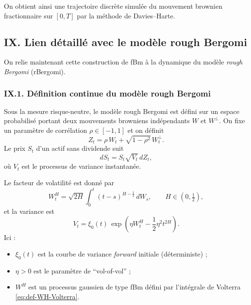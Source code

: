 \documentclass[11pt,a4paper]{article}
\newcommand{\1}{\mathbf{1}}
\begin{document}
On obtient ainsi une trajectoire discrète simulée du mouvement
brownien fractionnaire sur $[0,T]$ par la méthode de
Davies--Harte.

\subsection*{IX. Lien détaillé avec le modèle rough Bergomi}

On relie maintenant cette construction de fBm à la dynamique du
modèle \emph{rough Bergomi} (rBergomi).

\subsubsection*{IX.1. Définition continue du modèle rough Bergomi}

Sous la mesure risque-neutre, le modèle rough Bergomi est défini
sur un espace probabilisé portant deux mouvements browniens
indépendants $W$ et $W^\perp$. On fixe un paramètre de corrélation
$\rho\in[-1,1]$ et on définit
\begin{equation}
  Z_t = \rho\,W_t + \sqrt{1-\rho^2}\,W_t^\perp.
\end{equation}
Le prix $S_t$ d'un actif sans dividende suit
\begin{equation}
  dS_t = S_t \sqrt{V_t}\,dZ_t,
\end{equation}
où $V_t$ est le processus de variance instantanée.

Le facteur de volatilité est donné par
\begin{equation}
  \label{eq:def-WH-Volterra}
  W_t^H = \sqrt{2H}\int_0^t (t-s)^{H-\frac12}\,dW_s,
  \qquad H\in(0,\tfrac12),
\end{equation}
et la variance est
\begin{equation}
  \label{eq:def-V-rBergomi}
  V_t = \xi_0(t)\,
        \exp\!\left(
          \eta W_t^H - \frac12 \eta^2 t^{2H}
        \right).
\end{equation}
Ici :
\begin{itemize}
  \item $\xi_0(t)$ est la courbe de variance \emph{forward} initiale
        (déterministe) ;
  \item $\eta>0$ est le paramètre de ``vol-of-vol'' ;
  \item $W^H$ est un processus gaussien de type fBm défini par
        l'intégrale de Volterra \eqref{eq:def-WH-Volterra}.
\end{itemize}
\end{document}
